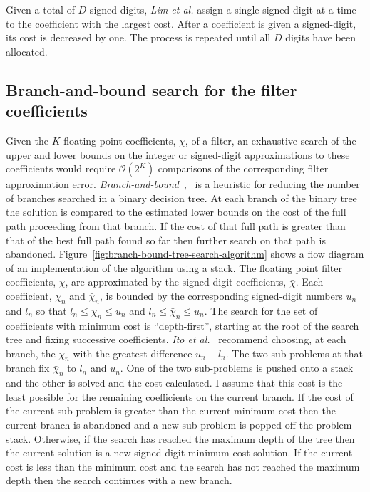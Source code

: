 \documentclass[a4paper,twoside,10pt,english]{article}
\begin{document}
Given a total of $D$ signed-digits, \emph{Lim et al.} assign a single 
signed-digit at a time to the coefficient with the largest cost. After a 
coefficient is given a signed-digit, its cost is decreased by one. The
process is repeated until all $D$ digits have been allocated.

\subsection{Branch-and-bound search for the filter coefficients}
Given the $K$ floating point coefficients, $\chi$, of a filter, an exhaustive
search of the upper and lower bounds on the integer or signed-digit
approximations to these coefficients would require
$\mathcal{O}\left(2^{K}\right)$ comparisons of the corresponding filter
approximation error.
\emph{Branch-and-bound}~\cite{LandDoig_AutomaticMethodSolvingDiscreteProgrammingProblems},~\cite[p.627]{Sedgewick_AlgorithmsInCPlusPlus}
is a heuristic for reducing the 
number of branches searched in a binary decision tree. At each branch of the
binary tree the solution is compared to the estimated lower bounds on the cost
of the full path proceeding from that branch. If the cost of that full path is
greater than that of the best full path found so far then further search on
that path is abandoned.  Figure~\ref{fig:branch-bound-tree-search-algorithm}
shows a flow diagram of an implementation of the algorithm using a stack. The
floating point filter coefficients, $\chi$, are approximated by the
signed-digit coefficients, $\bar{\chi}$. Each coefficient, $\chi_{n}$
and $\bar{\chi}_{n}$, is bounded by the corresponding signed-digit numbers $u_{n}$
and $l_{n}$ so that $l_{n}\le\chi_{n}\le{}u_{n}$ and
$l_{n}\le\bar{\chi}_{n}\le u_{n}$. The search for the set of coefficients with
minimum cost is ``depth-first'', starting at the root of the search tree and
fixing successive coefficients.  \emph{Ito et
  al.}~\cite{Ito_PowersOfTwoAllocationFIR} recommend choosing, at each branch,
the $\chi_{n}$ with the greatest difference $u_{n}-l_{n}$. The two sub-problems
at that branch fix $\bar{\chi}_{n}$ to $l_{n}$ and $u_{n}$. One of the two
sub-problems is pushed onto a stack and the other is solved and the cost
calculated. I assume that this cost is the least possible for the remaining
coefficients on the current branch. If the cost of the current sub-problem is
greater than the current minimum cost then the current branch is abandoned and a
new sub-problem is popped off the problem stack. Otherwise, if the search has
reached the maximum depth of the tree then the current solution is a new
signed-digit minimum cost solution. If the current cost is less than the
minimum cost and the search has not reached the maximum depth then the search
continues with a new branch.
\end{document}
